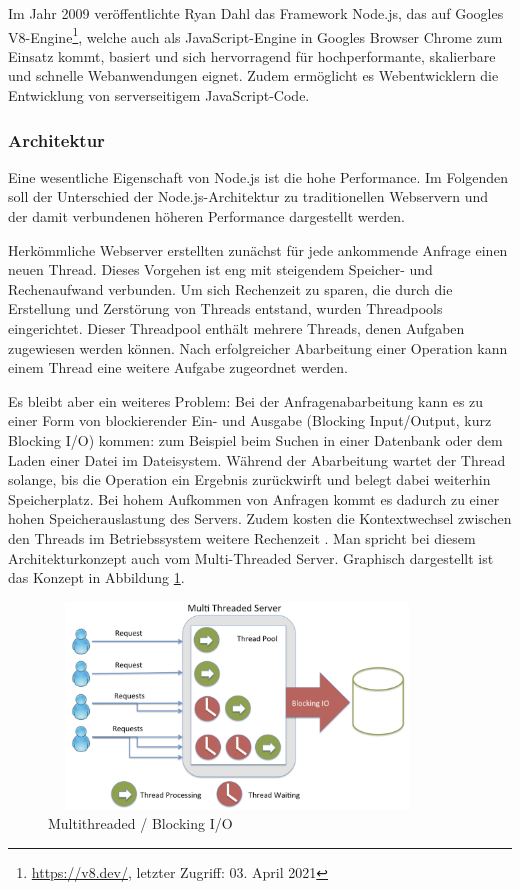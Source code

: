 Im Jahr 2009 veröffentlichte Ryan Dahl das Framework Node.js, das auf Googles V8-Engine\footnote{\url{https://v8.dev/}, letzter Zugriff: 03. April 2021}, welche auch als JavaScript-Engine in Googles Browser Chrome zum Einsatz kommt, basiert und sich hervorragend für hochperformante, skalierbare und schnelle Webanwendungen eignet. Zudem ermöglicht es Webentwicklern die Entwicklung von serverseitigem JavaScript-Code.


\subsubsection{Architektur}
Eine wesentliche Eigenschaft von Node.js ist die hohe Performance. Im Folgenden soll der Unterschied der Node.js-Architektur zu traditionellen Webservern und der damit verbundenen höheren Performance dargestellt werden.
\newline

\noindent
Herkömmliche Webserver erstellten zunächst für jede ankommende Anfrage einen neuen Thread. Dieses Vorgehen ist eng mit steigendem Speicher- und Rechenaufwand verbunden. Um sich Rechenzeit zu sparen, die durch die Erstellung und Zerstörung von Threads entstand, wurden Threadpools eingerichtet. Dieser Threadpool enthält mehrere Threads, denen Aufgaben zugewiesen werden können. Nach erfolgreicher Abarbeitung einer Operation kann einem Thread eine weitere Aufgabe zugeordnet werden.
\newline

\noindent
Es bleibt aber ein weiteres Problem: Bei der Anfragenabarbeitung kann es zu einer Form von blockierender Ein- und Ausgabe (Blocking Input/Output, kurz Blocking I/O) kommen: zum Beispiel beim Suchen in einer Datenbank oder dem Laden einer Datei im Dateisystem.
 Während der Abarbeitung wartet der Thread solange, bis die Operation ein Ergebnis zurückwirft und belegt dabei weiterhin Speicherplatz. 
 Bei hohem Aufkommen von Anfragen kommt es dadurch zu einer hohen Speicherauslastung des Servers. Zudem kosten die Kontextwechsel zwischen den Threads im Betriebssystem weitere Rechenzeit \cite{Node1.05}. Man spricht bei diesem Architekturkonzept auch vom Multi-Threaded Server. Graphisch dargestellt ist das Konzept in Abbildung \ref{fig:Multithreaded}.
\newline

\begin{figure}[tbt]
\centering
\includegraphics[width=10cm, height = 5.5cm]{images/nodejs_otherthreading.png}
\caption[Multithreaded / Blocking I/O]{Multithreaded / Blocking I/O \cite{Node1.1}}
\label{fig:Multithreaded}
\end{figure}
 
